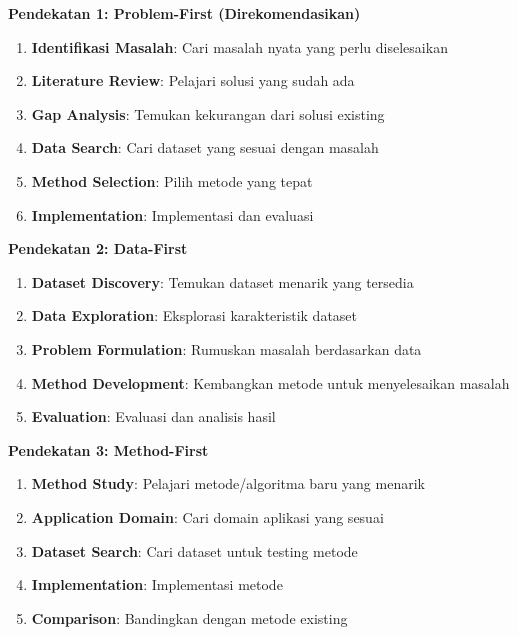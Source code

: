 \textbf{Pendekatan 1: Problem-First (Direkomendasikan)}
\begin{enumerate}
    \item \textbf{Identifikasi Masalah}: Cari masalah nyata yang perlu diselesaikan
    \item \textbf{Literature Review}: Pelajari solusi yang sudah ada
    \item \textbf{Gap Analysis}: Temukan kekurangan dari solusi existing
    \item \textbf{Data Search}: Cari dataset yang sesuai dengan masalah
    \item \textbf{Method Selection}: Pilih metode yang tepat
    \item \textbf{Implementation}: Implementasi dan evaluasi
\end{enumerate}

\textbf{Pendekatan 2: Data-First}
\begin{enumerate}
    \item \textbf{Dataset Discovery}: Temukan dataset menarik yang tersedia
    \item \textbf{Data Exploration}: Eksplorasi karakteristik dataset
    \item \textbf{Problem Formulation}: Rumuskan masalah berdasarkan data
    \item \textbf{Method Development}: Kembangkan metode untuk menyelesaikan masalah
    \item \textbf{Evaluation}: Evaluasi dan analisis hasil
\end{enumerate}

\textbf{Pendekatan 3: Method-First}
\begin{enumerate}
    \item \textbf{Method Study}: Pelajari metode/algoritma baru yang menarik
    \item \textbf{Application Domain}: Cari domain aplikasi yang sesuai
    \item \textbf{Dataset Search}: Cari dataset untuk testing metode
    \item \textbf{Implementation}: Implementasi metode
    \item \textbf{Comparison}: Bandingkan dengan metode existing
\end{enumerate}

